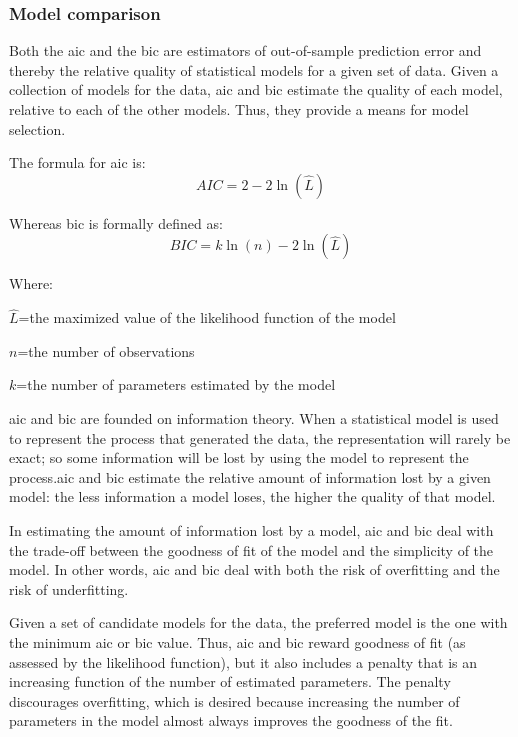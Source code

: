 \subsubsection{Model comparison}
Both the \gls{aic} and the \gls{bic} are estimators of out-of-sample prediction error and thereby the relative quality of statistical models for a given set of data.\cite{Akaike1974,Schwarz1978} Given a collection of models for the data, \gls{aic} and \gls{bic} estimate the quality of each model, relative to each of the other models. Thus, they provide a means for model selection.

The formula for \gls{aic} is:
\[AIC =  2-2\ln(\hat{L})\]

Whereas \gls{bic} is formally defined as:
\[BIC =  k\ln(n)-2\ln(\hat{L})\]

Where:
\begin{description}
	\item $\hat{L}$=the maximized value of the likelihood function of the model
	
	\item $n$=the number of observations
	
	\item $k$=the number of parameters estimated by the model
\end{description}

\gls{aic} and \gls{bic} are founded on information theory. When a statistical model is used to represent the process that generated the data, the representation will rarely be exact; so some information will be lost by using the model to represent the process.\gls{aic} and \gls{bic} estimate the relative amount of information lost by a given model: the less information a model loses, the higher the quality of that model.

In estimating the amount of information lost by a model, \gls{aic} and \gls{bic} deal with the trade-off between the goodness of fit of the model and the simplicity of the model. In other words, \gls{aic} and \gls{bic} deal with both the risk of overfitting and the risk of underfitting.

Given a set of candidate models for the data, the preferred model is the one with the minimum \gls{aic} or \gls{bic} value. Thus, \gls{aic} and \gls{bic} reward goodness of fit (as assessed by the likelihood function), but it also includes a penalty that is an increasing function of the number of estimated parameters. The penalty discourages overfitting, which is desired because increasing the number of parameters in the model almost always improves the goodness of the fit.

